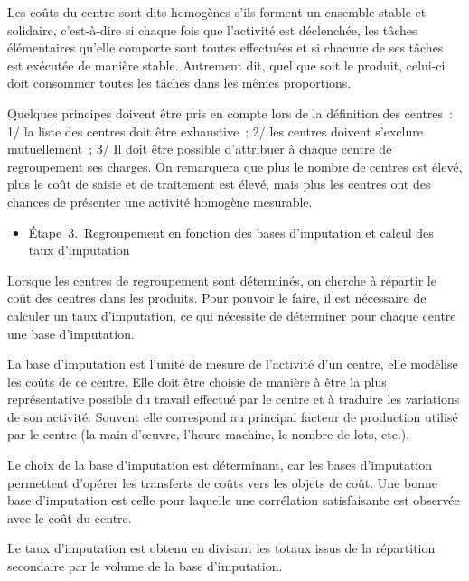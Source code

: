 \documentclass[oneside]{kaobook}
\begin{document}
Les coûts du centre sont dits homogènes s'ils forment un ensemble stable et solidaire, c'est-à-dire si chaque fois que l'activité est déclenchée, les tâches élémentaires qu'elle comporte sont toutes effectuées et si chacune de ses tâches est exécutée de manière stable. Autrement dit, quel que soit le produit, celui-ci doit consommer toutes les tâches dans les mêmes proportions.

Quelques principes doivent être pris en compte lors de la définition des centres : 1/ la liste des centres doit être exhaustive ; 2/ les centres doivent s'exclure mutuellement ; 3/ Il doit être possible d'attribuer à chaque centre de regroupement ses charges. On remarquera que plus le nombre de centres est élevé, plus le coût de saisie et de traitement est élevé, mais plus les centres ont des chances de présenter une activité homogène mesurable.

\begin{itemize}
\item Étape 3. Regroupement en fonction des bases d’imputation et calcul des taux d’imputation
\end{itemize}

Lorsque les centres de regroupement sont déterminés, on cherche à répartir le coût des centres dans les produits. Pour pouvoir le faire, il est nécessaire de calculer un taux d'imputation, ce qui nécessite de déterminer pour chaque centre une base d'imputation. 

La base d'imputation est l'unité de mesure de l'activité d'un centre, elle modélise les coûts de ce centre. Elle doit être choisie de manière à être la plus représentative possible du travail effectué par le centre et à traduire les variations de son activité. Souvent elle correspond au principal facteur de production utilisé par le centre (la main d'œuvre, l'heure machine, le nombre de lots, etc.).

Le choix de la base d'imputation est déterminant, car les bases d'imputation permettent d'opérer les transferts de coûts vers les objets de coût. Une bonne base d'imputation est celle pour laquelle une corrélation satisfaisante est observée avec le coût du centre.

Le taux d'imputation est obtenu en divisant les totaux issus de la répartition secondaire par le volume de la base d'imputation.
\end{document}
